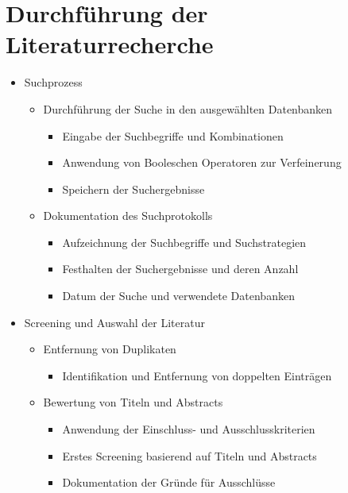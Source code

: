 \section{Durchführung der Literaturrecherche}
\begin{itemize}
    \item Suchprozess
        \begin{itemize}
            \item Durchführung der Suche in den ausgewählten Datenbanken
                \begin{itemize}
                    \item Eingabe der Suchbegriffe und Kombinationen
                    \item Anwendung von Booleschen Operatoren zur Verfeinerung
                    \item Speichern der Suchergebnisse
                \end{itemize}
            \item Dokumentation des Suchprotokolls
                \begin{itemize}
                    \item Aufzeichnung der Suchbegriffe und Suchstrategien
                    \item Festhalten der Suchergebnisse und deren Anzahl
                    \item Datum der Suche und verwendete Datenbanken
                \end{itemize}
        \end{itemize}
    \item Screening und Auswahl der Literatur
        \begin{itemize}
            \item Entfernung von Duplikaten
                \begin{itemize}
                    \item Identifikation und Entfernung von doppelten Einträgen
                \end{itemize}
            \item Bewertung von Titeln und Abstracts
                \begin{itemize}
                    \item Anwendung der Einschluss- und Ausschlusskriterien
                    \item Erstes Screening basierend auf Titeln und Abstracts
                    \item Dokumentation der Gründe für Ausschlüsse

\end{itemize}
\end{itemize}
\end{itemize}

